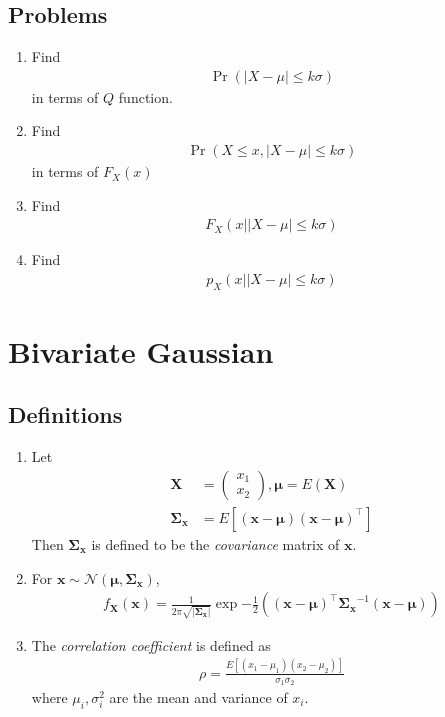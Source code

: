 \documentclass[journal,12pt,onecolumn]{IEEEtran}
\renewcommand\thesection{\arabic{section}}
\renewcommand\thesubsection{\thesection.\arabic{subsection}}
\providecommand{\pr}[1]{\ensuremath{\Pr\left(#1\right)}}
\providecommand{\sbrak}[1]{\ensuremath{{}\left[#1\right]}}
\providecommand{\brak}[1]{\ensuremath{\left(#1\right)}}
\theoremstyle{remark}
\providecommand{\abs}[1]{\left\vert#1\right\vert}
\newcommand{\myvec}[1]{\ensuremath{\begin{pmatrix}#1\end{pmatrix}}}
\numberwithin{equation}{section}
\let\vec\mathbf
\begin{document}
\subsection{Problems}
\begin{enumerate}[label=\arabic*.,ref=\thesubsection.\theenumi]
\item Find 
\begin{align}
	\pr{\abs{X-\mu} \leq k\sigma}
\end{align}
 in terms of $Q$ function.
\item Find 
\begin{align}
	\pr{X \leq x, \abs{X-\mu} \leq k\sigma}
\end{align}
		in terms of $F_X(x)$
\item Find 
\begin{align}
	F_X\brak{x | \abs{X-\mu} \leq k\sigma}
\end{align}
\item Find 
\begin{align}
	p_X\brak{x | \abs{X-\mu} \leq k\sigma}
\end{align}
\end{enumerate}
\section{Bivariate Gaussian}
\subsection{Definitions}
\begin{enumerate}[label=\arabic*.,ref=\thesubsection.\theenumi]
\item Let
\begin{align}
	\vec{X} &= \myvec{x_1\\x_2}, \bm{\mu} = E\brak{\vec{X}}
	\\
	\vec{\Sigma_{x}} &= E\sbrak{\brak{\vec{x}-\bm{\mu}}\brak{ \vec{x}-\bm{\mu}}^{\top}}
\end{align}
		Then $\vec{\Sigma_{x}}$ is defined to be the {\em covariance} matrix  of $\vec{x}$.
\item For $\vec{x} \sim \mathcal{N}\brak{\bm{\mu}, \vec{\Sigma_{x}}}$,
\begin{align}
	f_{\vec{X}}(\vec{x}) = \frac{1}{2\pi\sqrt{\abs{\vec{\Sigma_{x}}}}}\exp{{-\frac{1}{2}\brak{\brak{\vec{x}-\bm{\mu}}^\top\vec{\Sigma_{x}}^{-1}\brak{\vec{x}-\bm{\mu}}}}}
\end{align}
\item The {\em correlation coefficient} is defined as
\begin{align}
	\rho = \frac{E\sbrak{\brak{x_1-\mu_{1}}\brak{x_2-\mu_{2}}}}{\sigma_{1}\sigma_{2}}
\end{align}
where $\mu_i,\sigma_i^2$ are the mean and variance of $x_i$.
\end{enumerate}
\end{document}
